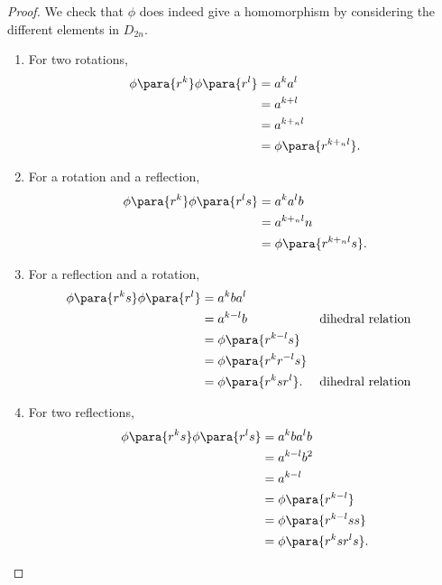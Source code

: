 \begin{proof}
    We check that \(\phi\) does indeed give a homomorphism by considering the different elements in \(D_{2n}\).

    \begin{enumerate}
        \item For two rotations,
        \begin{align*}
            \phi\para{r^k} \phi\para{r^l} &= a^k a^l \\
            &= a^{k + l} \\
            &= a^{k +_n l} \\
            &= \phi\para{r^{k +_n l}}.
        \end{align*}
        \item For a rotation and a reflection,
        \begin{align*}
            \phi\para{r^k} \phi\para{r^l s} &= a^k a^l b \\
            &= a^{k +_n l} n \\
            &= \phi\para{r^{k +_n l} s}.
        \end{align*}
        \item For a reflection and a rotation,
        \begin{align*}
            \phi\para{r^k s} \phi\para{r^l} &= a^k b a^l \\
            &= a^{k - l} b && \text{dihedral relation} \\
            &= \phi\para{r^{k - l} s} \\
            &= \phi\para{r^k r^{-l} s} \\
            &= \phi\para{r^k s r^l}. && \text{dihedral relation}
        \end{align*}
        \item For two reflections,
        \begin{align*}
            \phi\para{r^k s} \phi\para{r^l s} &= a^k b a^l b \\
            &= a^{k - l} b^2 \\
            &= a^{k - l} \\
            &= \phi\para{r^{k - l}} \\
            &= \phi\para{r^{k - l} s s} \\
            &= \phi\para{r^{k} s r^{l} s}.
        \end{align*}
    \end{enumerate}
\end{proof}

